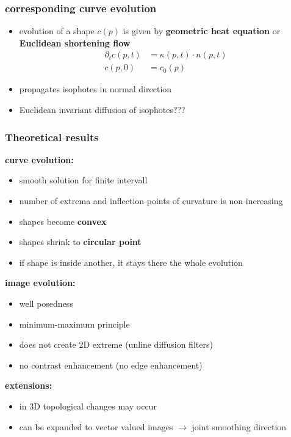 \documentclass[11pt]{article}
\begin{document}
\subsubsection{corresponding curve evolution}
\label{sec-8-3-1}
\begin{itemize}
\item evolution of a shape $c(p)$ is given by \textbf{geometric heat equation} or
      \textbf{Euclidean shortening flow}
\begin{align*}
  \partial_t c(p,t) &= \kappa(p,t)\cdot n(p,t) \\
  c(p,0) &= c_0(p)
\end{align*}
\item propagates isophotes in normal direction
\item Euclidean invariant diffusion of isophotes???
\end{itemize}
\subsubsection{Theoretical results}
\label{sec-8-3-2}
\textbf{curve evolution:}
\begin{itemize}
\item smooth solution for finite intervall
\item number of extrema and inflection points of curvature is non increasing
\item shapes become \textbf{convex}
\item shapes shrink to \textbf{circular point}
\item if shape is inside another, it stays there the whole evolution
\end{itemize}
\textbf{image evolution:}
\begin{itemize}
\item well posedness
\item minimum-maximum principle
\item does not create 2D extreme (unline diffusion filters)
\item no contrast enhancement (no edge enhancement)
\end{itemize}
\textbf{extensions:}
\begin{itemize}
\item in 3D topological changes may occur
\item can be expanded to vector valued images $\rightarrow$ joint smoothing direction
\end{itemize}
\end{document}
